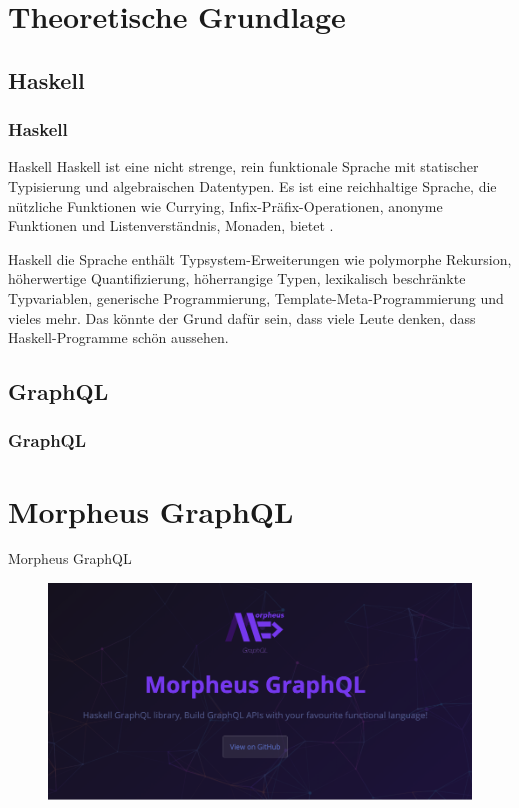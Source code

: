
\section{Theoretische Grundlage}

\subsection{Haskell}
\begin{frame}{}
    \frametitle{Haskell}
\end{frame}

\begin{frame}{}

    \begin{alertblock}{Haskell}
        Haskell ist eine nicht strenge, rein funktionale Sprache mit statischer Typisierung und algebraischen Datentypen. Es ist eine reichhaltige Sprache, die nützliche Funktionen wie Currying, Infix-Präfix-Operationen, anonyme Funktionen und Listenverständnis, Monaden, bietet \cite{history-of-haskell}.

    \end{alertblock}

    \begin{examples}{Haskell}
    die Sprache enthält Typsystem-Erweiterungen wie polymorphe Rekursion, höherwertige Quantifizierung, höherrangige Typen, lexikalisch beschränkte Typvariablen, generische Programmierung, Template-Meta-Programmierung und vieles mehr. Das könnte der Grund dafür sein, dass viele Leute denken, dass Haskell-Programme schön \cite{history-of-haskell} aussehen.
    \end{examples}

\end{frame}


\subsection{GraphQL}
\begin{frame}{}
    \frametitle{GraphQL}
\end{frame}


\section{Morpheus GraphQL}
\begin{frame}{Morpheus GraphQL}
    \begin{figure}
        \centering
        \includegraphics[width=1.1\textwidth]{assets/img/morpheus-graphql-bg.png}
    \end{figure}
\end{frame}